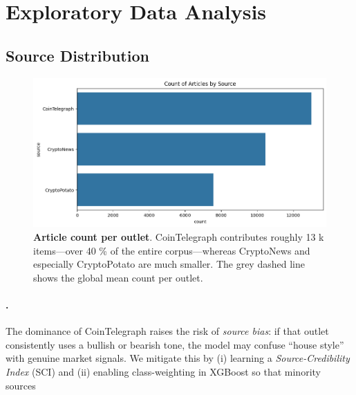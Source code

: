 \documentclass[12pt,a4paper]{article}
\begin{document}
\section{Exploratory Data Analysis}\label{sec:eda}
\subsection{Source Distribution}
\begin{figure}[H]
  \centering
  \includegraphics[width=\linewidth]{output.png}
  \caption{\textbf{Article count per outlet}.  
  CoinTelegraph contributes roughly 13 k items—over 40 \% of the entire
  corpus—whereas CryptoNews and especially CryptoPotato are much
  smaller.  The grey dashed line shows the global mean count per
  outlet.}
  \label{fig:source}
\end{figure}

\paragraph{.}
The dominance of CoinTelegraph raises the risk of \emph{source bias}:
if that outlet consistently uses a bullish or bearish tone, the model
may confuse “house style” with genuine market signals.  We mitigate
this by (i) learning a \emph{Source-Credibility Index} (SCI) and
(ii) enabling class-weighting in XGBoost so that minority sources
\end{document}

